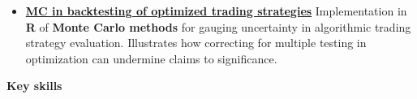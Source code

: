 \documentclass[10pt, a4paper]{article}
\begin{document}
\begin{itemize} [leftmargin=*]



\vspace{-1mm}

\normalsize 
\item 	\href{https://rfl-urbaniak.github.io/backtesting/}{
	\textbf{MC in backtesting of optimized trading strategies}} 
\newline  \scriptsize  Implementation in \textbf{\textsf{R}} of \textbf{Monte Carlo methods} for gauging uncertainty in algorithmic trading strategy evaluation. Illustrates how correcting for multiple testing in optimization can undermine claims to significance.





\end{itemize}




\vspace{-1mm}
	
\textbf{{\sc \Large Key skills}}\\

\vspace{-4mm}
\end{document}

